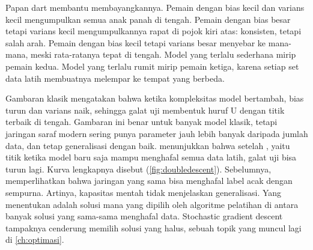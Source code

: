 Papan dart membantu membayangkannya. Pemain dengan bias kecil dan varians kecil mengumpulkan
semua anak panah di tengah. Pemain dengan bias besar tetapi varians kecil mengumpulkannya rapat
di pojok kiri atas: konsisten, tetapi salah arah. Pemain dengan bias kecil tetapi varians besar
menyebar ke mana-mana, meski rata-ratanya tepat di tengah. Model yang terlalu sederhana mirip
pemain kedua. Model yang terlalu rumit mirip pemain ketiga, karena setiap set data latih
membuatnya melempar ke tempat yang berbeda.

Gambaran klasik mengatakan bahwa ketika kompleksitas model bertambah, bias turun dan varians
naik, sehingga galat uji membentuk huruf U dengan titik terbaik di tengah. Gambaran ini benar
untuk banyak model klasik, tetapi jaringan saraf modern sering punya parameter jauh lebih banyak
daripada jumlah data, dan tetap generalisasi dengan baik. \citet{belkin2019} menunjukkan bahwa
setelah , yaitu titik ketika model baru saja mampu menghafal semua
data latih, galat uji bisa turun lagi. Kurva lengkapnya disebut 
(\cref{fig:doubledescent}). Sebelumnya, \citet{zhang2017} memperlihatkan bahwa jaringan yang sama
bisa menghafal label acak dengan sempurna. Artinya, kapasitas mentah tidak menjelaskan
generalisasi. Yang menentukan adalah solusi mana yang dipilih oleh algoritme pelatihan di antara
banyak solusi yang sama-sama menghafal data. Stochastic gradient descent tampaknya cenderung
memilih solusi yang halus, sebuah topik yang muncul lagi di \cref{ch:optimasi}.

